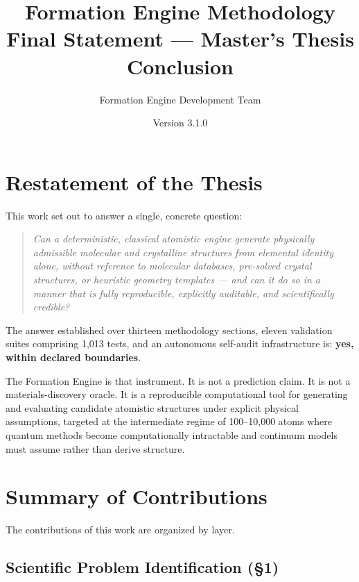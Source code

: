 \documentclass[11pt]{article}
\title{\textbf{Formation Engine Methodology} \\
\Large Final Statement --- Master's Thesis Conclusion}
\author{Formation Engine Development Team}
\date{Version 3.1.0}
\begin{document}
\maketitle

\tableofcontents
\newpage

\section{Restatement of the Thesis}

This work set out to answer a single, concrete question:

\begin{quote}
\textit{Can a deterministic, classical atomistic engine generate
physically admissible molecular and crystalline structures from
elemental identity alone, without reference to molecular databases,
pre-solved crystal structures, or heuristic geometry templates ---
and can it do so in a manner that is fully reproducible,
explicitly auditable, and scientifically credible?}
\end{quote}

The answer established over thirteen methodology sections, eleven
validation suites comprising 1,013 tests, and an autonomous
self-audit infrastructure is: \textbf{yes, within declared boundaries}.

The Formation Engine is that instrument.  It is not a prediction
claim.  It is not a materials-discovery oracle.  It is a reproducible
computational tool for generating and evaluating candidate atomistic
structures under explicit physical assumptions, targeted at the
intermediate regime of 100--10,000 atoms where quantum methods
become computationally intractable and continuum models must
assume rather than derive structure.

\section{Summary of Contributions}

The contributions of this work are organized by layer.

\subsection{Scientific Problem Identification (\S1)}
\end{document}
